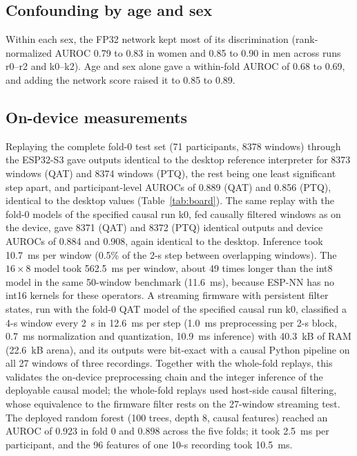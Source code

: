 \documentclass[preprint,12pt]{elsarticle}
\begin{document}
\subsection{Confounding by age and sex}
Within each sex, the FP32 network kept most of its discrimination (rank-normalized AUROC 0.79 to 0.83 in women and 0.85 to 0.90 in men across runs r0--r2 and k0--k2). Age and sex alone gave a within-fold AUROC of 0.68 to 0.69, and adding the network score raised it to 0.85 to 0.89.

\subsection{On-device measurements}
Replaying the complete fold-0 test set (71 participants, 8378 windows) through the ESP32-S3 gave outputs identical to the desktop reference interpreter for 8373 windows (QAT) and 8374 windows (PTQ), the rest being one least significant step apart, and participant-level AUROCs of 0.889 (QAT) and 0.856 (PTQ), identical to the desktop values (Table~\ref{tab:board}). The same replay with the fold-0 models of the specified causal run k0, fed causally filtered windows as on the device, gave 8371 (QAT) and 8372 (PTQ) identical outputs and device AUROCs of 0.884 and 0.908, again identical to the desktop. Inference took 10.7~ms per window (0.5\% of the 2-s step between overlapping windows). The $16\times8$ model took 562.5~ms per window, about 49 times longer than the int8 model in the same 50-window benchmark (11.6~ms), because ESP-NN has no int16 kernels for these operators. A streaming firmware with persistent filter states, run with the fold-0 QAT model of the specified causal run k0, classified a 4-s window every 2~s in 12.6~ms per step (1.0~ms preprocessing per 2-s block, 0.7~ms normalization and quantization, 10.9~ms inference) with 40.3~kB of RAM (22.6~kB arena), and its outputs were bit-exact with a causal Python pipeline on all 27 windows of three recordings. Together with the whole-fold replays, this validates the on-device preprocessing chain and the integer inference of the deployable causal model; the whole-fold replays used host-side causal filtering, whose equivalence to the firmware filter rests on the 27-window streaming test. The deployed random forest (100 trees, depth 8, causal features) reached an AUROC of 0.923 in fold 0 and 0.898 across the five folds; it took 2.5~ms per participant, and the 96 features of one 10-s recording took 10.5~ms.
\end{document}
